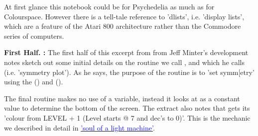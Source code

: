 \clearpage
At first glance this notebook could be for Psychedelia as much as for Colourspace. However there is a tell-tale reference
to 'dlists', i.e. 'display lists', which are a feature of the Atari 800 architecture rather than the Commodore series of 
computers.

\textbf{First Half. :} 
The first half of this excerpt from from Jeff Minter's development notes sketch out some initial details on the routine
we call , and which he calls  (i.e. 'symmetry plot'). As he says, the
purpose of the routine is to 'set symm[etry' using the  () and  ().

The final routine makes no use of a  variable, instead it looks at  as a constant value to determine the
bottom of the screen. The extract also notes that  gets its 'colour from LEVEL + 1 (Level starts @ 7 and dec's to 0)'.
This is the mechanic we described in detail in \hyperref[sec:listing_pattern]{\textcolor{blue}{'soul of a light machine'}}.

\clearpage

